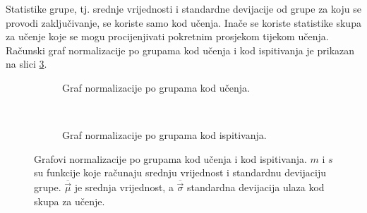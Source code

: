 \documentclass[utf8, diplomski, lmodern]{fer}
\begin{document}
Statistike grupe, tj. srednje vrijednosti i standardne devijacije od grupe za koju se provodi zaključivanje, se koriste samo kod učenja. Inače se koriste statistike skupa za učenje koje se mogu procijenjivati pokretnim prosjekom tijekom učenja. Računski graf normalizacije po grupama kod učenja i kod ispitivanja je prikazan na slici \ref{fig:bn-graf}.

\begin{figure}
	\centering
	\begin{subfigure}[t]{0.48\textwidth}
		\centering
		\caption{Graf normalizacije po grupama kod učenja.}
		\label{subfig:bn-ucenje}
	\end{subfigure}
	~
	\begin{subfigure}[t]{0.48\textwidth}
		\centering
		\caption{Graf normalizacije po grupama kod ispitivanja.}
		\label{subfig:bn-ispitivanje}
	\end{subfigure}
	\caption{Grafovi normalizacije po grupama kod učenja i kod ispitivanja. $m$ i $s$ su funkcije koje računaju srednju vrijednost i standardnu devijaciju grupe. $\overline{\vec\mu}$ je srednja vrijednost, a $\overline{\vec\sigma}$ standardna devijacija ulaza kod skupa za učenje.}
	\label{fig:bn-graf}
\end{figure}
\end{document}
